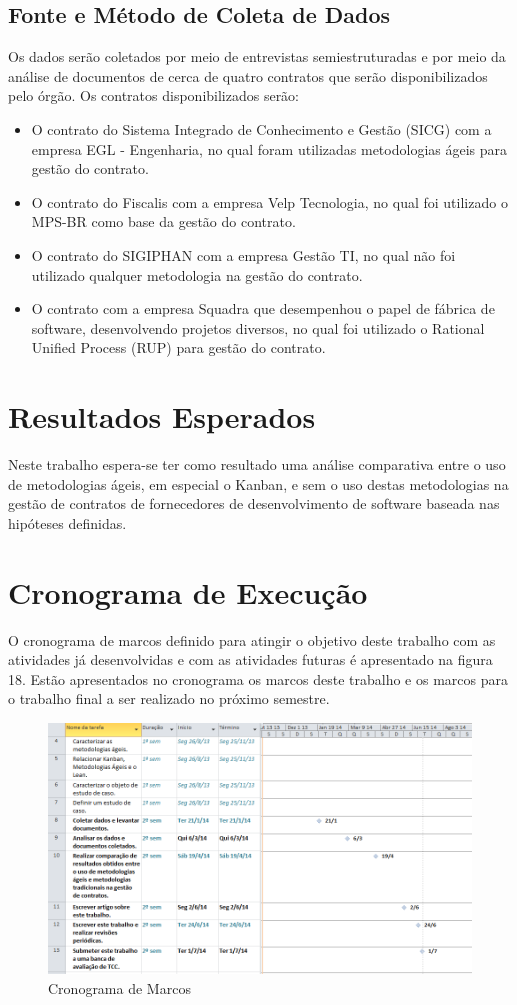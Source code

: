 \subsection[Fonte e Método Coleta de Dados]{Fonte e Método de Coleta de Dados}

Os dados serão coletados por meio de entrevistas semiestruturadas e por meio da análise de documentos de cerca de quatro contratos que serão disponibilizados pelo órgão. Os contratos disponibilizados serão:
\begin{itemize}
\item  O contrato do Sistema Integrado de Conhecimento e Gestão (SICG) com a empresa EGL - Engenharia, no qual foram utilizadas metodologias ágeis para gestão do contrato.
\item  O contrato do Fiscalis com a empresa Velp Tecnologia, no qual foi utilizado o MPS-BR como base da gestão do contrato.
\item  O contrato do SIGIPHAN com a empresa Gestão TI, no qual não foi utilizado qualquer metodologia na gestão do contrato.
\item  O contrato com a empresa Squadra que desempenhou o papel de fábrica de software, desenvolvendo projetos diversos, no qual foi utilizado o Rational Unified Process (RUP) para gestão do contrato.
\end{itemize}

\section[Resultados Esperados]{Resultados Esperados}

Neste trabalho espera-se ter como resultado uma análise comparativa entre o uso de metodologias ágeis, em especial o Kanban, e sem o uso destas metodologias na gestão de contratos de fornecedores de desenvolvimento de software baseada nas hipóteses definidas.

\section[Cronograma de Execução]{Cronograma de Execução}

O cronograma de marcos definido para atingir o objetivo deste trabalho com as atividades já desenvolvidas e com as atividades futuras é apresentado na figura 18. Estão apresentados  no cronograma os marcos deste trabalho e os marcos para o trabalho final a ser realizado no próximo semestre.

\begin{figure}[h]
		\centering
		\label{fig02}
			\includegraphics[scale=0.6]{figuras/cronograma2.png}
		\caption{Cronograma de Marcos}
\end{figure}

